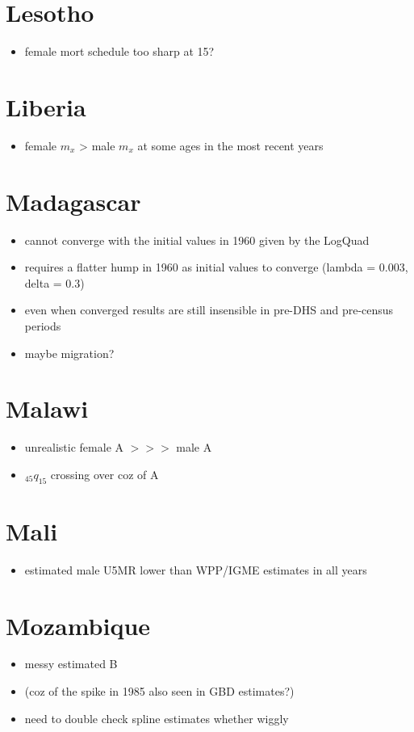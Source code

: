 \documentclass[12pt,a4paper]{article}
\begin{document}
\section*{Lesotho}
\begin{itemize}
\item female mort schedule too sharp at 15?
\end{itemize}

\section*{Liberia}
\begin{itemize}
\item  female $m_x$ > male $m_x$ at some ages in the most recent years
\end{itemize}

\section*{Madagascar}
\begin{itemize}
\item cannot converge with the initial values in 1960 given by the LogQuad
\item requires a flatter hump in 1960 as initial values to converge (lambda = 0.003, delta = 0.3)
\item even when converged results are still insensible in pre-DHS and pre-census periods
\item maybe migration?
\end{itemize}

\section*{Malawi}
\begin{itemize}
\item unrealistic female A $>>>$ male A
\item $_{45}q_{15}$ crossing over coz of A
\end{itemize}

\section*{Mali}
\begin{itemize}
\item estimated male U5MR lower than WPP/IGME estimates in all years
\end{itemize}

\section*{Mozambique}
\begin{itemize}
\item messy estimated B
\item (coz of the spike in 1985 also seen in GBD estimates?)
\item need to double check spline estimates whether wiggly
\end{itemize}
\end{document}
